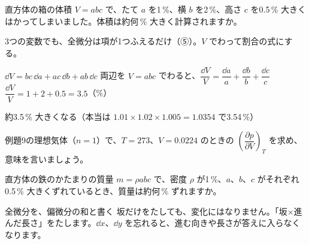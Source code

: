 \begin{reidai}[3つの変数の全微分（誤差）]
直方体の箱の体積 $V=abc$ で、たて $a$ を1\,\%、横 $b$ を2\,\%、高さ $c$ を0.5\,\% 大きくはかってしまいました。体積は約何\,\% 大きく計算されますか。\par
\kangaekata 3つの変数でも、全微分は項が1つふえるだけ（⑤）。$V$ でわって割合の式にする。\par
\shiki $\dd V=bc\,\dd a+ac\,\dd b+ab\,\dd c$\kviiidq
両辺を $V=abc$ でわると、$\dfrac{\dd V}{V}=\dfrac{\dd a}{a}+\dfrac{\dd b}{b}+\dfrac{\dd c}{c}$\kviiidq
$\dfrac{\dd V}{V}=1+2+0.5=3.5$（\%）\par
\kotae 約3.5\,\% 大きくなる（本当は $1.01\times1.02\times1.005=1.0354$ で3.54\,\%）
\end{reidai}

\noindent\begin{minipage}[t]{0.49\linewidth}
\begin{jibun}
例題9の理想気体（$n=1$）で、$T=273$、$V=0.0224$ のときの $\left(\dfrac{\partial p}{\partial V}\right)_T$ を求め、意味を言いましょう。
\end{jibun}
\end{minipage}\hfill
\begin{minipage}[t]{0.49\linewidth}
\begin{jibun}
直方体の鉄のかたまりの質量 $m=\rho abc$ で、密度 $\rho$ が1\,\%、$a$、$b$、$c$ がそれぞれ0.5\,\% 大きくずれているとき、質量は約何\,\% ずれますか。
\end{jibun}
\end{minipage}\par




\begin{tsumazuki}{全微分を、偏微分の和と書く}
坂だけをたしても、変化にはなりません。「坂×進んだ長さ」をたします。$\dd x$、$\dd y$ を忘れると、進む向きや長さが答えに入らなくなります。
\end{tsumazuki}

